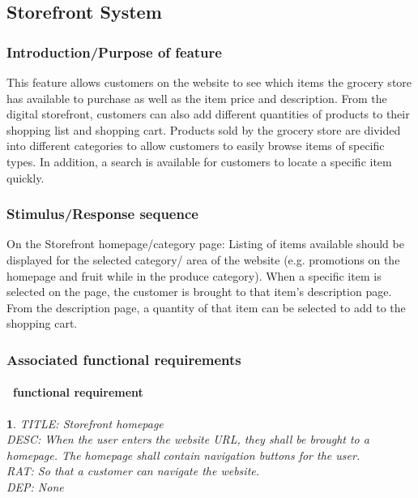 \documentclass{scrreprt}
\theoremstyle{funreq}
\newtheorem{funreq}{}
\begin{document}
	\subsection{Storefront System}
\subsubsection{Introduction/Purpose of feature}
This feature allows customers on the website to see which items the grocery store has available to purchase as well as the item price and description.  From the digital storefront, customers can also add different quantities of products to their shopping list and shopping cart.  Products sold by the grocery store are divided into different categories to allow customers to easily browse items of specific types.  In addition, a search is available for customers to locate a specific item quickly.
\subsubsection{Stimulus/Response sequence}
On the Storefront homepage/category page: Listing of items available should be displayed for the selected category/ area of the website (e.g. promotions on the homepage and fruit while in the produce category).  When a specific item is selected on the page, the customer is brought to that item’s description page.  From the description page, a quantity of that item can be selected to add to the shopping cart.  
\subsubsection{Associated functional requirements}

\paragraph[]{\Subsectionname ~functional requirement }
\begin{funreq}
	\label{store_home}
	TITLE: Storefront homepage\\
	DESC: When the user enters the website URL, they shall be brought to a homepage.  The homepage shall contain navigation buttons for the user.\\
	RAT: So that a customer can navigate the website.\\
	DEP: None\\
\end{funreq}
\end{document}
